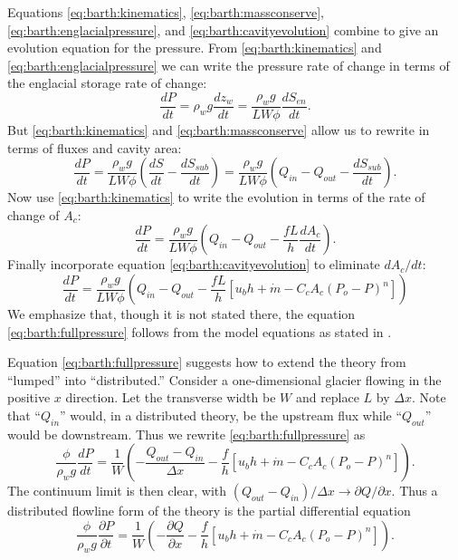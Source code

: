 \documentclass[11pt,final]{amsart}
\begin{document}
Equations \eqref{eq:barth:kinematics}, \eqref{eq:barth:massconserve}, \eqref{eq:barth:englacialpressure}, and \eqref{eq:barth:cavityevolution} combine to give an evolution equation for the pressure.  From \eqref{eq:barth:kinematics} and \eqref{eq:barth:englacialpressure} we can write the pressure rate of change in terms of the englacial storage rate of change:
	$$\frac{dP}{dt} = \rho_w g \frac{dz_w}{dt} = \frac{\rho_w g}{L W \phi} \frac{d S_{en}}{dt}.$$
But \eqref{eq:barth:kinematics} and \eqref{eq:barth:massconserve}  allow us to rewrite in terms of fluxes and cavity area:
    $$\frac{dP}{dt} = \frac{\rho_w g}{L W \phi} \left(\frac{d S}{dt} - \frac{d S_{sub}}{dt}\right) = \frac{\rho_w g}{L W \phi} \left(Q_{in} - Q_{out} - \frac{d S_{sub}}{dt}\right).$$
Now use \eqref{eq:barth:kinematics} to write the evolution in terms of the rate of change of $A_c$:
    $$\frac{dP}{dt} = \frac{\rho_w g}{L W \phi} \left(Q_{in} - Q_{out} - \frac{f L }{h} \frac{d A_c}{dt}\right).$$
Finally incorporate equation \eqref{eq:barth:cavityevolution} to eliminate $dA_c/dt$:
\begin{equation}
\frac{dP}{dt} = \frac{\rho_w g}{L W \phi} \left(Q_{in} - Q_{out} - \frac{f L }{h} \left[u_b h + \dot m - C_c A_c (P_o-P)^n\right]\right)  \label{eq:barth:fullpressure}
\end{equation}
We emphasize that, though it is not stated there, the equation \eqref{eq:barth:fullpressure} follows from the model equations as stated in \cite{Bartholomausetal2011}.

Equation \eqref{eq:barth:fullpressure} suggests how to extend the \cite{Bartholomausetal2011} theory from ``lumped'' into ``distributed.''  Consider a one-dimensional glacier flowing in the positive $x$ direction.  Let the transverse width be $W$ and replace $L$ by $\Delta x$.  Note that ``$Q_{in}$'' would, in a distributed theory, be the upstream flux while ``$Q_{out}$'' would be downstream.  Thus we rewrite \eqref{eq:barth:fullpressure} as
\begin{equation*}
\frac{\phi}{\rho_w g}\frac{dP}{dt} = \frac{1}{W} \left(- \frac{Q_{out} - Q_{in}}{\Delta x} - \frac{f}{h} \left[u_b h + \dot m - C_c A_c (P_o-P)^n\right]\right).
\end{equation*}
The continuum limit is then clear, with $(Q_{out} - Q_{in})/\Delta x \to \partial Q/\partial x$.  Thus a distributed flowline form of the \cite{Bartholomausetal2011} theory is the partial differential equation
\begin{equation}
\frac{\phi}{\rho_w g} \frac{\partial P}{\partial t} = \frac{1}{W} \left(- \frac{\partial Q}{\partial x} - \frac{f}{h} \left[u_b h + \dot m - C_c A_c (P_o-P)^n\right]\right).  \label{eq:barth:distpressure}
\end{equation}
\end{document}
